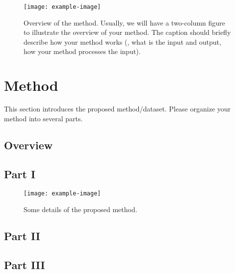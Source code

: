 \begin{figure*}[tb] \centering

    \texttt{[image: example-image]}
    \caption{Overview of the method. Usually, we will have a two-column figure to illustrate the overview of your method. The caption should briefly describe how your method works (\eg, what is the input and output, how your method processes the input).} \label{fig:figure2}
\end{figure*}

\section{Method}%
\label{sec:method}
This section introduces the proposed method/dataset. Please organize your method into several parts.

\subsection{Overview}%
\label{sub:Overview}

\subsection{Part I}%
\textcolor{lightgray}{\lipsum[1]}

\begin{figure}[tb] \centering
    \texttt{[image: example-image]}
    \caption{Some details of the proposed method. } \label{fig:figure3}
\end{figure}

\subsection{Part II}%
\textcolor{lightgray}{\lipsum[1]}

\subsection{Part III}%
\textcolor{lightgray}{\lipsum[1]}



